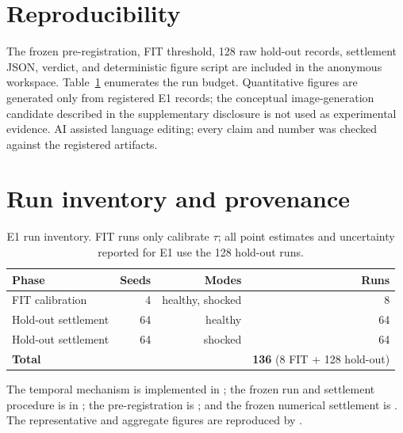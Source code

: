 \documentclass{article} %
\theoremstyle{remark}
\begin{document}
\section*{Reproducibility}

The frozen pre-registration, FIT threshold, 128 raw hold-out records, settlement JSON, verdict,
and deterministic figure script are included in the anonymous workspace. Table~\ref{tab:runs}
enumerates the run budget. Quantitative figures are generated only from registered E1 records; the
conceptual image-generation candidate described in the supplementary disclosure is not used as
experimental evidence. AI assisted language editing; every claim and number was checked against
the registered artifacts.

\label{p5:main-text-end}



\newpage
\appendix

\section{Run inventory and provenance}
\label{app:inventory}

\begin{table}[h]
\centering
\caption{E1 run inventory. FIT runs only calibrate $\tau$; all point estimates and uncertainty
reported for E1 use the 128 hold-out runs.}
\label{tab:runs}
\small
\begin{tabular}{lrrr}
\toprule
\textbf{Phase} & \textbf{Seeds} & \textbf{Modes} & \textbf{Runs} \\
\midrule
FIT calibration & 4 & healthy, shocked & 8 \\
Hold-out settlement & 64 & healthy & 64 \\
Hold-out settlement & 64 & shocked & 64 \\
\midrule
\textbf{Total} & & & \textbf{136} (8 FIT + 128 hold-out) \\
\bottomrule
\end{tabular}
\end{table}

The temporal mechanism is implemented in ; the frozen run and
settlement procedure is in ; the pre-registration
is ; and the frozen numerical settlement is
. The representative and aggregate
figures are reproduced by .
\end{document}
